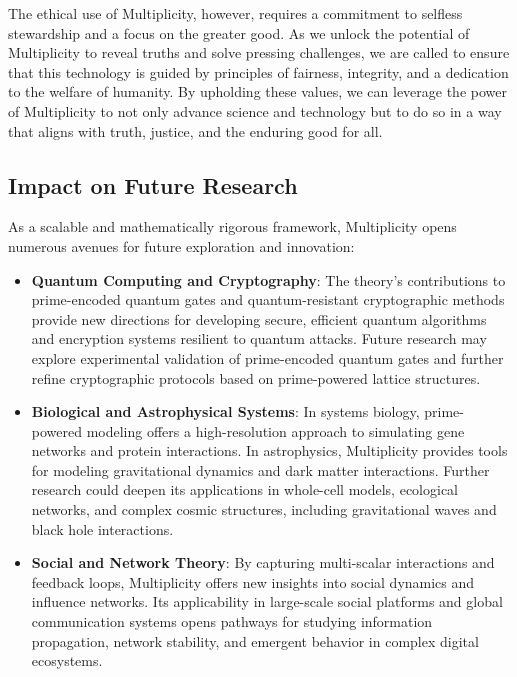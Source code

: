 \documentclass{article}
\theoremstyle{plain}
\begin{document}
\begin{enumerate}
The ethical use of Multiplicity, however, requires a commitment to selfless stewardship and a focus on the greater good. As we unlock the potential of Multiplicity to reveal truths and solve pressing challenges, we are called to ensure that this technology is guided by principles of fairness, integrity, and a dedication to the welfare of humanity. By upholding these values, we can leverage the power of Multiplicity to not only advance science and technology but to do so in a way that aligns with truth, justice, and the enduring good for all.

\subsection{Impact on Future Research}

As a scalable and mathematically rigorous framework, Multiplicity opens numerous avenues for future exploration and innovation:

\begin{itemize}
    \item \textbf{Quantum Computing and Cryptography}: The theory’s contributions to prime-encoded quantum gates and quantum-resistant cryptographic methods provide new directions for developing secure, efficient quantum algorithms and encryption systems resilient to quantum attacks. Future research may explore experimental validation of prime-encoded quantum gates and further refine cryptographic protocols based on prime-powered lattice structures.
    
    \item \textbf{Biological and Astrophysical Systems}: In systems biology, prime-powered modeling offers a high-resolution approach to simulating gene networks and protein interactions. In astrophysics, Multiplicity provides tools for modeling gravitational dynamics and dark matter interactions. Further research could deepen its applications in whole-cell models, ecological networks, and complex cosmic structures, including gravitational waves and black hole interactions.
    
    \item \textbf{Social and Network Theory}: By capturing multi-scalar interactions and feedback loops, Multiplicity offers new insights into social dynamics and influence networks. Its applicability in large-scale social platforms and global communication systems opens pathways for studying information propagation, network stability, and emergent behavior in complex digital ecosystems.
\end{itemize}


\end{enumerate}
\end{document}
